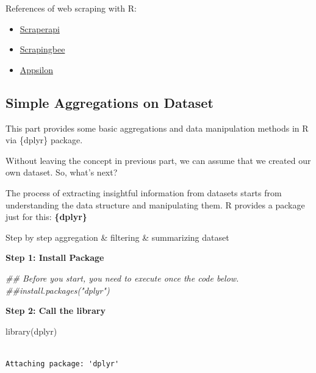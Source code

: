 \documentclass[
  letterpaper,
  DIV=11,
  numbers=noendperiod]{scrreprt}
\newenvironment{Shaded}{\begin{snugshade}}{\end{snugshade}}
\newcommand{\DocumentationTok}[1]{\textcolor[rgb]{0.37,0.37,0.37}{\textit{#1}}}
\newcommand{\FunctionTok}[1]{\textcolor[rgb]{0.28,0.35,0.67}{#1}}
\newcommand{\NormalTok}[1]{\textcolor[rgb]{0.00,0.23,0.31}{#1}}
\providecommand{\tightlist}{%
  \setlength{\itemsep}{0pt}\setlength{\parskip}{0pt}}\usepackage{longtable,booktabs,array}
\begin{document}
References of web scraping with R:

\begin{itemize}
\tightlist
\item
  \href{https://www.scraperapi.com/blog/web-scraping-with-r/}{Scraperapi}
\item
  \href{https://www.scrapingbee.com/blog/web-scraping-r/}{Scrapingbee}
\item
  \href{https://appsilon.com/webscraping-dynamic-websites-with-r/}{Appsilon}
\end{itemize}

\hypertarget{simple-aggregations-on-dataset}{%
\subsection{Simple Aggregations on
Dataset}\label{simple-aggregations-on-dataset}}

This part provides some basic aggregations and data manipulation methods
in R via \{dplyr\} package.

Without leaving the concept in previous part, we can assume that we
created our own dataset. So, what's next?

The process of extracting insightful information from datasets starts
from understanding the data structure and manipulating them. R provides
a package just for this: \textbf{\{dplyr\}}

Step by step aggregation \& filtering \& summarizing dataset

\textbf{Step 1: Install Package}

\begin{Shaded}
\begin{Highlighting}[]
\DocumentationTok{\#\# Before you start, you need to execute once the code below.}
\DocumentationTok{\#\#install.packages("dplyr")}
\end{Highlighting}
\end{Shaded}

\textbf{Step 2: Call the library}

\begin{Shaded}
\begin{Highlighting}[]
\FunctionTok{library}\NormalTok{(dplyr)}
\end{Highlighting}
\end{Shaded}

\begin{verbatim}

Attaching package: 'dplyr'
\end{verbatim}
\end{document}
